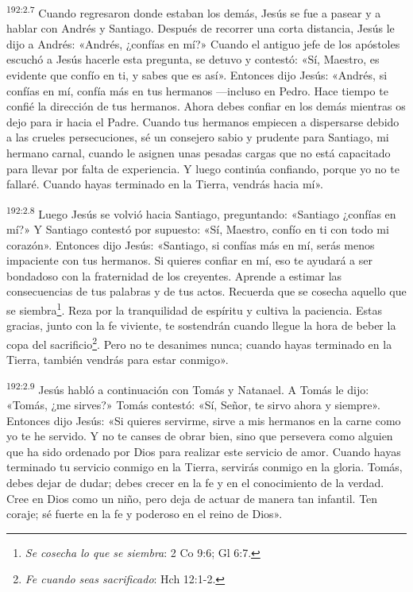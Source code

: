 \par
\textsuperscript{192:2.7} Cuando regresaron donde estaban los demás, Jesús se fue a pasear y a hablar con Andrés y Santiago. Después de recorrer una corta distancia, Jesús le dijo a Andrés: «Andrés, ¿confías en mí?» Cuando el antiguo jefe de los apóstoles escuchó a Jesús hacerle esta pregunta, se detuvo y contestó: «Sí, Maestro, es evidente que confío en ti, y sabes que es así». Entonces dijo Jesús: «Andrés, si confías en mí, confía más en tus hermanos ---incluso en Pedro. Hace tiempo te confié la dirección de tus hermanos. Ahora debes confiar en los demás mientras os dejo para ir hacia el Padre. Cuando tus hermanos empiecen a dispersarse debido a las crueles persecuciones, sé un consejero sabio y prudente para Santiago, mi hermano carnal, cuando le asignen unas pesadas cargas que no está capacitado para llevar por falta de experiencia. Y luego continúa confiando, porque yo no te fallaré. Cuando hayas terminado en la Tierra, vendrás hacia mí».

\par
\textsuperscript{192:2.8} Luego Jesús se volvió hacia Santiago, preguntando: «Santiago ¿confías en mí?» Y Santiago contestó por supuesto: «Sí, Maestro, confío en ti con todo mi corazón». Entonces dijo Jesús: «Santiago, si confías más en mí, serás menos impaciente con tus hermanos. Si quieres confiar en mí, eso te ayudará a ser bondadoso con la fraternidad de los creyentes. Aprende a estimar las consecuencias de tus palabras y de tus actos. Recuerda que se cosecha aquello que se siembra\footnote{\textit{Se cosecha lo que se siembra}: 2 Co 9:6; Gl 6:7.}. Reza por la tranquilidad de espíritu y cultiva la paciencia. Estas gracias, junto con la fe viviente, te sostendrán cuando llegue la hora de beber la copa del sacrificio\footnote{\textit{Fe cuando seas sacrificado}: Hch 12:1-2.}. Pero no te desanimes nunca; cuando hayas terminado en la Tierra, también vendrás para estar conmigo».

\par
\textsuperscript{192:2.9} Jesús habló a continuación con Tomás y Natanael. A Tomás le dijo: «Tomás, ¿me sirves?» Tomás contestó: «Sí, Señor, te sirvo ahora y siempre». Entonces dijo Jesús: «Si quieres servirme, sirve a mis hermanos en la carne como yo te he servido. Y no te canses de obrar bien, sino que persevera como alguien que ha sido ordenado por Dios para realizar este servicio de amor. Cuando hayas terminado tu servicio conmigo en la Tierra, servirás conmigo en la gloria. Tomás, debes dejar de dudar; debes crecer en la fe y en el conocimiento de la verdad. Cree en Dios como un niño, pero deja de actuar de manera tan infantil. Ten coraje; sé fuerte en la fe y poderoso en el reino de Dios».

